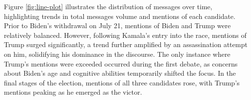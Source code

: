 Figure \ref{fig:line-plot} illustrates the distribution of messages over time, highlighting trends in total messages volume and mentions of each candidate. Prior to Biden's withdrawal on July 21, mentions of Biden and Trump were relatively balanced. However, following Kamala's entry into the race, mentions of Trump surged significantly, a trend further amplified by an assassination attempt on him, solidifying his dominance in the discourse. The only instance where Trump’s mentions were exceeded occurred during the first debate, as concerns about Biden’s age and cognitive abilities temporarily shifted the focus. In the final stages of the election, mentions of all three candidates rose, with Trump’s mentions peaking as he emerged as the victor.